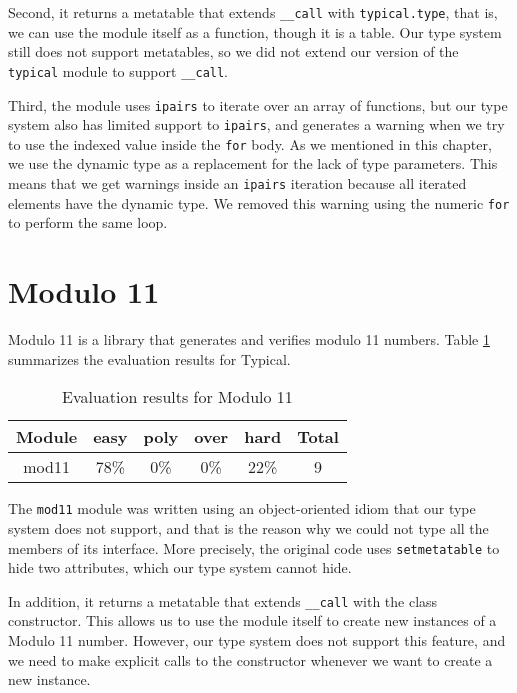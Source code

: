 Second, it returns a metatable that extends \texttt{\string_\string_call}
with \texttt{typical.type}, that is, we can use the module itself as a function,
though it is a table.
Our type system still does not support metatables, so we did not extend our version
of the \texttt{typical} module to support \texttt{\string_\string_call}.

Third, the module uses \texttt{ipairs} to iterate over an array of functions,
but our type system also has limited support to \texttt{ipairs}, and generates
a warning when we try to use the indexed value inside the \texttt{for} body.
As we mentioned in this chapter, we use the dynamic type as a replacement for
the lack of type parameters.
This means that we get warnings inside an \texttt{ipairs} iteration because
all iterated elements have the dynamic type.
We removed this warning using the numeric \texttt{for} to perform the same loop.

\section{Modulo 11}

Modulo 11 is a library that generates and verifies modulo 11 numbers.
Table \ref{tab:evalmod11} summarizes the evaluation results for Typical.

\begin{table}[!ht]
\begin{center}
\begin{tabular}{|c|c|c|c|c|c|}
\hline
\textbf{Module} & \textbf{easy} & \textbf{poly} & \textbf{over} & \textbf{hard} & \textbf{Total} \\
\hline
mod11 & 78\% & 0\% & 0\% & 22\% & 9 \\ %
\hline
\end{tabular}
\end{center}
\caption{Evaluation results for Modulo 11}
\label{tab:evalmod11}
\end{table}

The \texttt{mod11} module was written using an object-oriented idiom that
our type system does not support, and that is the reason why we could not
type all the members of its interface.
More precisely, the original code uses \texttt{setmetatable} to hide
two attributes, which our type system cannot hide.

In addition, it returns a metatable that extends \texttt{\string_\string_call}
with the class constructor.
This allows us to use the module itself to create new instances of a
Modulo 11 number.
However, our type system does not support this feature, and we need to
make explicit calls to the constructor whenever we want to create a
new instance.

